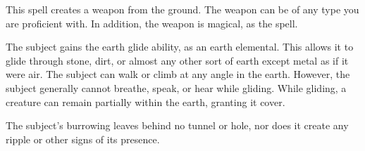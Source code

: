 \begin{spelleffect}
    This spell creates a weapon from the ground. The weapon can be of any type you are proficient with. In addition, the weapon is magical, as the  spell.
\end{spelleffect}

\spelldur{\durshort}
\begin{spelleffect}
  The subject gains the earth glide ability, as an earth elemental. This allows it to glide through stone, dirt, or almost any other sort of earth except metal  as if it were air. The subject can walk or climb at any angle in the earth. However, the subject generally cannot breathe, speak, or hear while gliding. While gliding, a creature can remain partially within the earth, granting it cover.
\end{spelleffect}
\begin{spellnotes}
  The subject's burrowing leaves behind no tunnel or hole, nor does it create any ripple or other signs of its presence.
\end{spellnotes}

